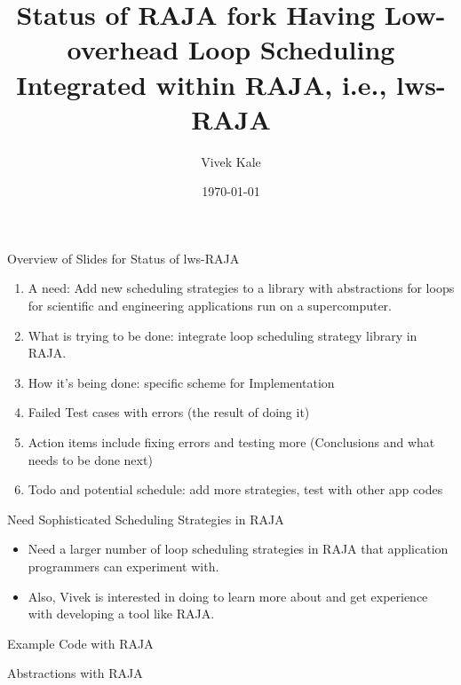 \documentclass{beamer}
\title{Status of RAJA fork Having Low-overhead Loop Scheduling Integrated within RAJA, i.e., lws-RAJA}
\author{Vivek Kale}
\date{\today}
\begin{document}
 

\begin{frame}
\titlepage
\end{frame}

\begin{frame}[label=ovwlwsRAJAstatus]{Overview of Slides for Status of lws-RAJA}
\begin{enumerate}
\item A need: Add new scheduling strategies to a library with abstractions for loops for scientific and engineering applications run on a supercomputer.
\item What is trying to be done: integrate loop scheduling strategy library in RAJA.
\item How it's being done: specific scheme for Implementation 
\item Failed Test cases with errors (the result of doing it) 
\item Action items include fixing errors and testing more (Conclusions and what needs to be done next)
\item Todo and potential schedule: add more strategies, test with other app codes
\end{enumerate}
\end{frame}

\begin{frame}{Need Sophisticated Scheduling Strategies in RAJA}
\begin{itemize}
\item Need a larger number of loop scheduling strategies in RAJA that application programmers can experiment with.
\item Also, Vivek is interested in doing to learn more about and get experience with developing a tool like RAJA. 
\end{itemize} 
\end{frame}


\begin{frame}{Example Code with RAJA}
\begin{figure}[ht!] 

\end{figure}
\end{frame}




\begin{frame}{Abstractions with RAJA}
\begin{figure}[ht!] 

\end{figure}
\end{frame}
\end{document}
